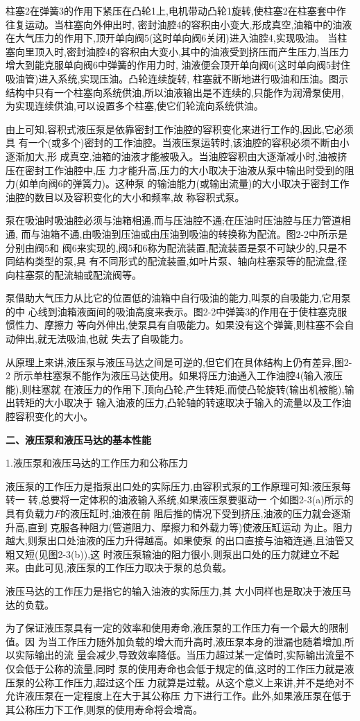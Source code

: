 柱塞2在弹簧3的作用下紧压在凸轮1上,电机带动凸轮1旋转,使柱塞2在柱塞套中作往复运动。当柱塞向外伸出时,
密封油腔4的容积由小变大,形成真空,油箱中的油液在大气压力的作用下,顶开单向阀5(这时单向阀6关闭)进入油腔4,实现吸油。
当柱塞向里顶入时,密封油腔4的容积由大变小,其中的油液受到挤压而产生压力,当压力增大到能克服单向阀6中弹簧的作用力时,
油液便会顶开单向阀6(这时单向阀5封住吸油管)进入系统,实现压油。凸轮连续旋转,
柱塞就不断地进行吸油和压油。图示结构中只有一个柱塞向系统供油,所以油液输出是不连续的,只能作为润滑泵使用,
为实现连续供油,可以设置多个柱塞,使它们轮流向系统供油。

由上可知,容积式液压泵是依靠密封工作油腔的容积变化来进行工作的,因此,它必须具
有一个(或多个)密封的工作油腔。当液压泵运转时,该油腔的容积必须不断由小逐渐加大,形
成真空,油箱的油液才能被吸入。当油腔容积由大逐渐减小时,油被挤压在密封工作油腔中,压
力才能升高,压力的大小取决于油液从泵中输出时受到的阻力(如单向阀6的弹簧力)。这种泵
的输油能力(或输出流量)的大小取决于密封工作油腔的数目以及容积变化的大小和频率,故
称容积式泵。

泵在吸油时吸油腔必须与油箱相通,而与压油腔不通;在压油时压油腔与压力管道相通,
而与油箱不通,由吸油到压油或由压油到吸油的转换称为配流。图2-2中所示是分别由阀5和
阀6来实现的,阀5和6称为配流装置,配流装置是泵不可缺少的,只是不同结构类型的泵,具
有不同形式的配流装置,如叶片泵、轴向柱塞泵等的配流盘,径向柱塞泵的配流轴或配流阀等。

泵借助大气压力从比它的位置低的油箱中自行吸油的能力,叫泵的自吸能力,它用泵的中
心线到油箱液面间的吸油高度来表示。图2-2中弹簧3的作用在于使柱塞克服惯性力、摩擦力
等向外伸出,使泵具有自吸能力。如果没有这个弹簧,则柱塞不会自动伸出,就无法吸油,也就
失去了自吸能力。

从原理上来讲,液压泵与液压马达之间是可逆的,但它们在具体结构上仍有差异,图2-2
所示单柱塞泵不能作为液压马达使用。如果将压力油通入工作油腔4(输入液压能),则柱塞就
在液压力的作用下,顶向凸轮,产生转矩,而使凸轮旋转(输出机被能),输出转矩的大小取决于
输入油液的压力,凸轮轴的转速取决于输入的流量以及工作油腔容积变化的大小。

\textbf{二、液压泵和液压马达的基本性能}

1.{\kaishu 液压泵和液压马达的工作压力和公称压力}

液压泵的工作压力是指泵出口处的实际压力,由容积式泵的工作原理可知:液压泵每转一
转,总要将一定体积的油液输入系统,如果液压泵要驱动一
个如图2-3(a)所示的具有负载力$F$的液压缸时,油液在前
阻后推的情况下受到挤压,油液的压力就会逐渐升高,直到
克服各种阻力(管道阻力、摩擦力和外载力等)使液压缸运动
为止。阻力越大,则泵出口处油液的压力升得越高。如果使泵
的出口直接与油箱连通,且油管又粗又短(见图2-3(b)),这
时液压泵输油的阻力很小,则泵出口处的压力就建立不起
来。由此可见,液压泵的工作压力取决于泵的总负载。

液压马达的工作压力是指它的输入油液的实际压力,其
大小同样也是取决于液压马达的负载。

为了保证液压泵具有一定的效率和使用寿命,液压泵的工作压力有一个最大的限制值。因
为当工作压力随外加负载的增大而升高时,液压泵本身的泄漏也随着增加,所以实际输出的流
量会减少,导致效率降低。当压力超过某一定值时,实际输出流量不仅会低于公称的流量,同时
泵的使用寿命也会低于规定的值,这时的工作压力就是液压泵的公称工作压力,超过这个压
力就算是过载。从这个意义上来讲,并不是绝对不允许液压泵在一定程度上在大于其公称压
力下进行工作。此外,如果液压泵在低于其公称压力下工作,则泵的使用寿命将会增高。